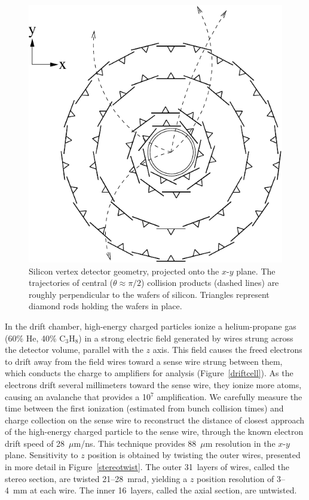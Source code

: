 \documentclass{cornell}
\begin{document}
\begin{figure}[p]
  \begin{center}
    \includegraphics[width=0.5\linewidth]{plots/sidiagram}
  \end{center}
  \caption{\label{sidiagram} Silicon vertex detector geometry,
  projected onto the $x$-$y$ plane.  The trajectories of central
  ($\theta \approx \pi/2$) collision products (dashed lines) are
  roughly perpendicular to the wafers of silicon.  Triangles represent
  diamond rods holding the wafers in place.}
\end{figure}

In the drift chamber, high-energy charged particles ionize a
helium-propane gas (60\% He, 40\% C$_3$H$_8$) in a strong electric
field generated by wires strung across the detector volume, parallel
with the $z$ axis.  This field causes the freed electrons to drift
away from the field wires toward a sense wire strung between them,
which conducts the charge to amplifiers for analysis
(Figure~\ref{driftcell}).  As the electrons drift several millimeters
toward the sense wire, they ionize more atoms, causing an avalanche
that provides a 10$^7$ amplification.  We carefully measure the time
between the first ionization (estimated from bunch collision times)
and charge collection on the sense wire to reconstruct the distance of
closest approach of the high-energy charged particle to the sense
wire, through the known electron drift speed of 28~$\mu$m/ns.  This
technique provides 88~$\mu$m resolution in the $x$-$y$ plane.
Sensitivity to $z$ position is obtained by twisting the outer wires,
presented in more detail in Figure~\ref{stereotwist}.  The outer
31~layers of wires, called the stereo section, are twisted
21--28~mrad, yielding a $z$ position resolution of 3--4~mm at each
wire.  The inner 16~layers, called the axial section, are untwisted.
\end{document}

